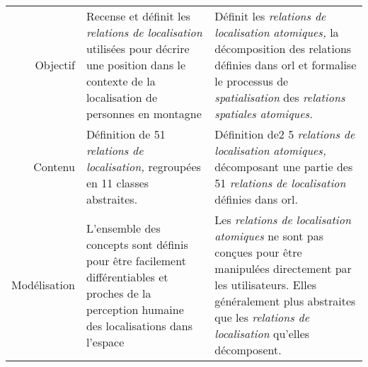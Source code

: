 \begin{tabular}{r>{\small}p{}>{\small}p{}}
  \toprule & \multicolumn{1}{c}{\ac{orl}} &
  \multicolumn{1}{c}{\ac{orla}} \\ \midrule
  \addlinespace
  Objectif & Recense et définit les \emph{relations de localisation} utilisées
  pour décrire une position dans le contexte de la localisation de
  personnes en montagne & Définit les \emph{relations de localisation
                          atomiques,} la décomposition des relations
  définies dans \ac{orl} et formalise le processus de
                          \emph{spatialisation} des \emph{relations
                          spatiales atomiques.}\\
  Contenu & Définition de 51 \emph{relations de localisation,}
            regroupées en 11 classes abstraites. & Définition de2 5
                                                   \emph{relations de
                                                   localisation
                                                   atomiques,}
                                                   décomposant une partie des
                                                   51 \emph{relations
                                                   de localisation}
                                                   définies dans \ac{orl}.\\
  Modélisation & L'ensemble des concepts sont définis pour être facilement
       différentiables et proches de la perception humaine des
       localisations dans l'espace & Les \emph{relations de
                                     localisation atomiques} ne sont
                                     pas conçues pour être manipulées
                                     directement par les utilisateurs.
  Elles généralement plus abstraites que les \emph{relations de
                                     localisation} qu'elles
                                     décomposent.\\ 
  \bottomrule
\end{tabular}
